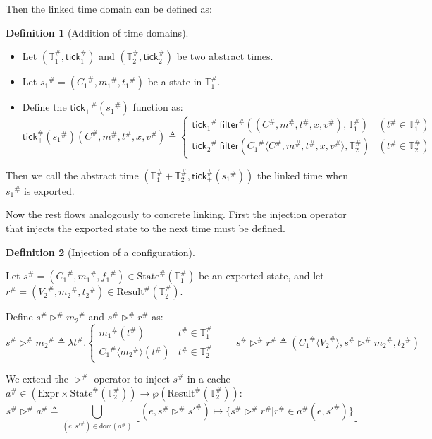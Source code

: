 \documentclass[acmsmall,review]{acmart}\settopmatter{printfolios=true,printccs=false,printacmref=false}
\theoremstyle{definition}
\newtheorem{definition}{Definition}[section]
\newcommand*{\A}[1]{{#1}^{\#}}
\newcommand*{\Expr}{\text{Expr}}
\newcommand*{\Time}{\mathbb{T}}
\newcommand*{\ATime}{\A{\Time}}
\newcommand*{\mem}{m}
\newcommand*{\AState}[1]{\A{\text{State}}({#1})}
\newcommand*{\AResult}[1]{\A{\text{Result}}({#1})}
\newcommand*{\tick}{\mathsf{tick}}
\newcommand*{\inject}[2]{{#1}\langle{#2}\rangle}
\newcommand*{\delete}[2]{{#1}\overline{\langle{#2}\rangle}}
\newcommand*{\filter}{\mathsf{filter}}
\begin{document}
Then the linked time domain can be defined as:
\begin{definition}[Addition of time domains]
  $\:$

  \begin{itemize}
    \item Let $(\ATime_1,\A\tick_1)$ and $(\ATime_2,\A\tick_2)$ be two abstract times.
    \item Let $\A{s_1}=(\A{C_1},\A{\mem_1},\A{t_1})$ be a state in $\ATime_1$.
    \item Define the $\A{\tick_{+}}(\A{s_1})$ function as:
          \[
            \A\tick_{+}(\A{s_1})(\A{C},\A\mem,\A{t},x,\A{v})\triangleq
            \begin{cases}
              \A{\tick_1}\:\A\filter((\A{C},\A\mem,\A{t},x,\A{v}),\ATime_1)               & (\A{t}\in\ATime_1) \\
              \A{\tick_2}\:\filter(\delete{\A{C_1}}{\A{C},\A\mem,\A{t},x,\A{v}},\ATime_2) & (\A{t}\in\ATime_2)
            \end{cases}
          \]
  \end{itemize}

  Then we call the abstract time $(\ATime_1+\ATime_2,\A\tick_{+}(\A{s_1}))$ the linked time when $\A{s_1}$ is exported.
\end{definition}

Now the rest flows analogously to concrete linking.
First the injection operator that injects the exported state to the next time must be defined.

\begin{definition}[Injection of a configuration]
  $\:$

  Let $\A{s}=(\A{C_1},\A{\mem_1},\A{f_1})\in\AState{\ATime_1}$ be an exported state, and let $\A{r}=(\A{V_2},\A{\mem_2},\A{t_2})\in\AResult{\ATime_2}$.

  Define $\A{s}\A\rhd \A{\mem_2}$ and $\A{s}\A\rhd \A{r}$ as:
  \[
    \A{s}\A\rhd\A{\mem_2}\triangleq
    \lambda \A{t}.
    \begin{cases}
      \A{\mem_1}(\A{t})                   & \A{t}\in\ATime_1 \\
      \inject{\A{C_1}}{\A{\mem_2}}(\A{t}) & \A{t}\in\ATime_2
    \end{cases}
    \qquad
    \A{s}\A\rhd \A{r}\triangleq
    (\inject{\A{C_1}}{\A{V_2}},\A{s}\A\rhd \A{\mem_2},\A{t_2})
  \]

  We extend the $\A\rhd$ operator to inject $\A{s}$ in a cache $\A{a}\in(\Expr\times\AState{\ATime_2})\rightarrow{\wp(\AResult{\ATime_2})}$:
  \[
    \A{s}\A\rhd\A{a}\triangleq\bigcup_{(e,\A{s'})\in\mathsf{dom}(\A{a})}[(e,\A{s}\A\rhd\A{s'})\mapsto\{\A{s}\A\rhd\A{r}|\A{r}\in\A{a}(e,\A{s'})\}]
  \]
\end{definition}
\end{document}
